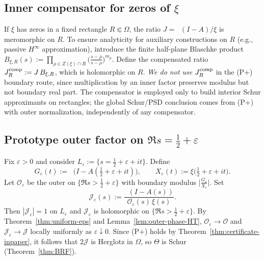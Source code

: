 \documentclass[11pt]{article}
\theoremstyle{definition}
\theoremstyle{remark}
\DeclareMathOperator{\dettwo}{det_2}
\begin{document}
\subsection{Inner compensator for zeros of \(\xi\)}\label{subsec:bl-compensator}
If \(\xi\) has zeros in a fixed rectangle \(R\Subset\Omega\), the ratio \(J=\dettwo(I-A)/\xi\) is meromorphic on \(R\).
To ensure analyticity for auxiliary constructions on \(R\) (e.g., passive \(H^\infty\) approximation), introduce the finite half-plane Blaschke product
\(
 B_{\xi,R}(s):=\prod_{\rho\in Z(\xi)\cap R} \big(\tfrac{s-\overline \rho}{s-\rho}\big)^{m_\rho}.
\)
Define the compensated ratio \(J_R^{\rm comp}:=J\,B_{\xi,R}\), which is holomorphic on \(R\).
\emph{We do not use} \(J_R^{\rm comp}\) in the (P+) boundary route, since multiplication by an inner factor preserves modulus but not boundary real part. The compensator is employed only to build interior Schur approximants on rectangles; the global Schur/PSD conclusion comes from (P+) with outer normalization, independently of any compensator.

\subsection{Prototype outer factor on \(\Re s=\tfrac12+\varepsilon\)}\label{subsec:outer-prototype}
Fix \(\varepsilon>0\) and consider \(L_{\varepsilon}:=\{s=\tfrac12+\varepsilon+it\}\). Define
\[
 G_{\varepsilon}(t):=\dettwo\big(I-A(\tfrac12+\varepsilon+it)\big),\qquad X_{\varepsilon}(t):=\xi\big(\tfrac12+\varepsilon+it\big).
\]
Let \(\mathcal O_{\varepsilon}\) be the outer on \(\{\Re s>\tfrac12+\varepsilon\}\) with boundary modulus \(\big|\frac{G_{\varepsilon}}{X_{\varepsilon}}\big|\). Set
\[
 \mathcal J_{\varepsilon}(s):=\frac{\dettwo(I-A(s))}{\mathcal O_{\varepsilon}(s)\,\xi(s)}.
\]
Then \(|\mathcal J_{\varepsilon}|=1\) on \(L_{\varepsilon}\) and \(\mathcal J_{\varepsilon}\) is holomorphic on \(\{\Re s>\tfrac12+\varepsilon\}\). By Theorem~\ref{thm:uniform-eps} and Lemma~\ref{lem:outer-phase-HT}, \(\mathcal O_{\varepsilon}\to\mathcal O\) and \(\mathcal J_{\varepsilon}\to\mathcal J\) locally uniformly as \(\varepsilon\downarrow 0\). Since (P+) holds by Theorem~\ref{thm:certificate-inpaper}, it follows that \(2\mathcal J\) is Herglotz in \(\Omega\), so \(\Theta\) is Schur (Theorem~\ref{thm:BRF}).
\end{document}
